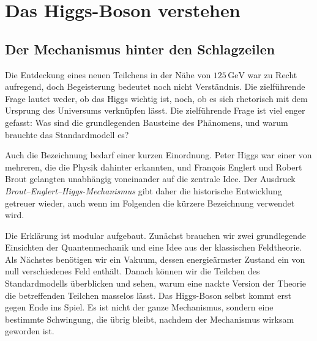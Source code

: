 \chapter{Das Higgs-Boson verstehen}


\section{Der Mechanismus hinter den Schlagzeilen}

Die Entdeckung eines neuen Teilchens in der Nähe von $125\,\mathrm{GeV}$ war zu Recht aufregend, doch Begeisterung bedeutet noch nicht Verständnis. Die zielführende Frage lautet weder, ob das Higgs wichtig ist, noch, ob es sich rhetorisch mit dem Ursprung des Universums verknüpfen lässt. Die zielführende Frage ist viel enger gefasst: Was sind die grundlegenden Bausteine des Phänomens, und warum brauchte das Standardmodell es?

Auch die Bezeichnung bedarf einer kurzen Einordnung. Peter Higgs war einer von mehreren, die die Physik dahinter erkannten, und Fran\c{c}ois Englert und Robert Brout gelangten unabhängig voneinander auf die zentrale Idee. Der Ausdruck \emph{Brout--Englert--Higgs-Mechanismus} gibt daher die historische Entwicklung getreuer wieder, auch wenn im Folgenden die kürzere Bezeichnung verwendet wird.

Die Erklärung ist modular aufgebaut. Zunächst brauchen wir zwei grundlegende Einsichten der Quantenmechanik und eine Idee aus der klassischen Feldtheorie. Als Nächstes benötigen wir ein Vakuum, dessen energieärmster Zustand ein von null verschiedenes Feld enthält. Danach können wir die Teilchen des Standardmodells überblicken und sehen, warum eine nackte Version der Theorie die betreffenden Teilchen masselos lässt. Das Higgs-Boson selbst kommt erst gegen Ende ins Spiel. Es ist nicht der ganze Mechanismus, sondern eine bestimmte Schwingung, die übrig bleibt, nachdem der Mechanismus wirksam geworden ist.

